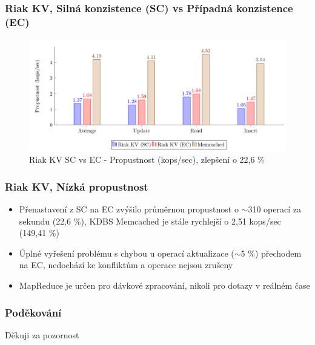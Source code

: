 \documentclass{beamer}
\begin{document}
	\begin{frame}
		\frametitle{Riak KV, Silná konzistence (SC) vs Případná konzistence (EC)}
		\begin{figure}
			\centering
			\includegraphics[scale=0.44]{Figures/riak_sc_ec.PNG}
			\caption{Riak KV SC vs EC - Propustnost (kops/sec), zlepšení o 22,6 \%}
		\end{figure}
	\end{frame}
	
	\begin{frame}
		\frametitle{Riak KV, Nízká propustnost}
		\begin{itemize}
			\item Přenastavení z SC na EC zvýšilo průměrnou propustnost o $\sim$310 operací za sekundu (22,6 \%), KDBS Memcached je stále rychlejší o 2,51 kops/sec (149,41 \%)
			\item Úplné vyřešení problému s chybou u operací aktualizace ($\sim$5 \%) přechodem na EC, nedochází ke konfliktům a operace nejsou zrušeny
			\item MapReduce je určen pro dávkové zpracování, nikoli pro dotazy v reálném čase
		\end{itemize}
	\end{frame}
	
	\begin{frame}[noframenumbering]
		\frametitle{Poděkování}
		\begin{center}
			\Huge
			Děkuji za pozornost
		\end{center}
	\end{frame}
\end{document}
